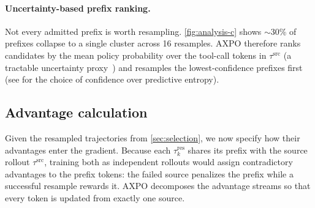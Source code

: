 \paragraph{Uncertainty-based prefix ranking.}
Not every admitted prefix is worth resampling. \autoref{fig:analysis-c} shows $\sim$30\% of prefixes collapse to a single cluster across 16 resamples. AXPO therefore ranks candidates by the mean policy probability over the tool-call tokens in $\tau^{\text{src}}$ (a tractable uncertainty proxy~\citep{deepconf}) and resamples the lowest-confidence prefixes first (see  for the choice of confidence over predictive entropy).

\subsection{Advantage calculation}
\label{sec:credit}

Given the resampled trajectories from \autoref{sec:selection}, we now specify how their advantages enter the gradient. Because each $\tau_k^{\text{res}}$ shares its prefix with the source rollout $\tau^{\text{src}}$, training both as independent rollouts would assign contradictory advantages to the prefix tokens: the failed source penalizes the prefix while a successful resample rewards it. AXPO decomposes the advantage streams so that every token is updated from exactly one source.

